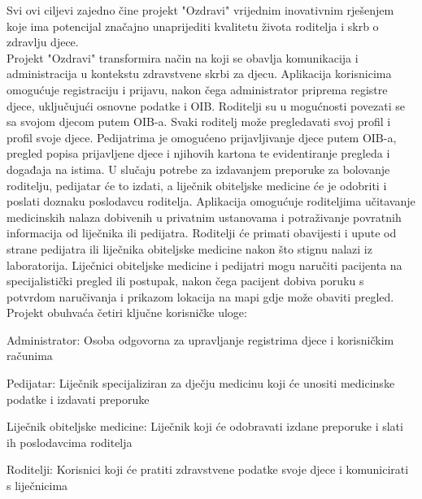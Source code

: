 Svi ovi ciljevi zajedno čine projekt "Ozdravi" vrijednim inovativnim rješenjem koje ima potencijal značajno unaprijediti kvalitetu života roditelja i skrb o zdravlju djece. \\

Projekt "Ozdravi" transformira način na koji se obavlja komunikacija i administracija u kontekstu zdravstvene skrbi za djecu. Aplikacija korisnicima omogućuje registraciju i prijavu, nakon čega administrator priprema registre djece, uključujući osnovne podatke i OIB. Roditelji su u mogućnosti povezati se sa svojom djecom putem OIB-a. Svaki roditelj može pregledavati svoj profil i profil svoje djece. Pedijatrima je omogućeno prijavljivanje djece putem OIB-a, pregled popisa prijavljene djece i njihovih kartona te evidentiranje pregleda i događaja na istima. U slučaju potrebe za izdavanjem preporuke za bolovanje roditelju, pedijatar će to izdati, a liječnik obiteljske medicine će je odobriti i poslati doznaku poslodavcu roditelja. Aplikacija omogućuje roditeljima učitavanje medicinskih nalaza dobivenih u privatnim ustanovama i potraživanje povratnih informacija od liječnika ili pedijatra. Roditelji će primati obavijesti i upute od strane pedijatra ili liječnika obiteljske medicine nakon što stignu nalazi iz laboratorija. Liječnici obiteljske medicine i pedijatri mogu naručiti pacijenta na specijalistički pregled ili postupak, nakon čega pacijent dobiva poruku s potvrdom naručivanja i prikazom lokacija na mapi gdje može obaviti pregled.
\\

Projekt obuhvaća četiri ključne korisničke uloge:
\begin{packed_enum}
    \item Administrator: Osoba odgovorna za upravljanje registrima djece i korisničkim računima
    \item Pedijatar: Liječnik specijaliziran za dječju medicinu koji će unositi medicinske podatke i izdavati preporuke
    \item Liječnik obiteljske medicine: Liječnik koji će odobravati izdane preporuke i slati ih poslodavcima roditelja
    \item Roditelji: Korisnici koji će pratiti zdravstvene podatke svoje djece i komunicirati s liječnicima
\end{packed_enum}

